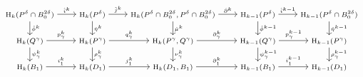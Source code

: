 \begin{equation}
\begin{scriptsize}
\begin{tikzcd}
    \hom_k(P^\delta\cap B_0^{2\delta})\arrow{r}{\hat{i}^k}\arrow{d}{\hat{\phi}^k} &
    \hom_k(P^\delta)\arrow{r}{\hat{j}^k}\arrow{d}{\hat{\eta}^k} &
    \hom_k(P^\delta\cap B_0^{2\delta}, P^\delta\cap B_0^{2\delta})\arrow{r}{\hat{\partial}^k}\arrow{d}{\hat{\mu}^k} &
    \hom_{k-1}(P^\delta)\arrow{r}{\hat{i}^{k-1}}\arrow{d}{\hat{\phi}^{k-1}} &
    \hom_{k-1}(P^\delta\cap B_0^{2\delta})\arrow{d}{\hat{\eta}^{k-1}}\\
    \hom_k(Q^\gamma)\arrow{r}{p^k_\gamma} \arrow{d}{\psi^k_\gamma} &
    \hom_k(P^\gamma)\arrow{r}{q^k_\gamma} \arrow{d}{\rho^k_\gamma} &
    \hom_k(P^\gamma, Q^\gamma)\arrow{r}{\partial^k_\gamma} \arrow{d}{\nu^k_\gamma} &
    \hom_{k-1}(Q^\gamma)\arrow{r}{p^{k-1}_\gamma} \arrow{d}{\psi^{k-1}_\gamma} &
    \hom_{k-1}(P^\gamma)\arrow{d}{\rho^{k-1}_\gamma}\\
    \hom_k(B_1)\arrow{r}{i^k_1} &
    \hom_k(D_1)\arrow{r}{j^k_1} &
    \hom_k(D_1, B_1)\arrow{r}{\partial^k_1} &
    \hom_{k-1}(B_1)\arrow{r}{i^{k-1}_1} &
    \hom_{k-1}(D_1)
\end{tikzcd}
\end{scriptsize}
\end{equation}


